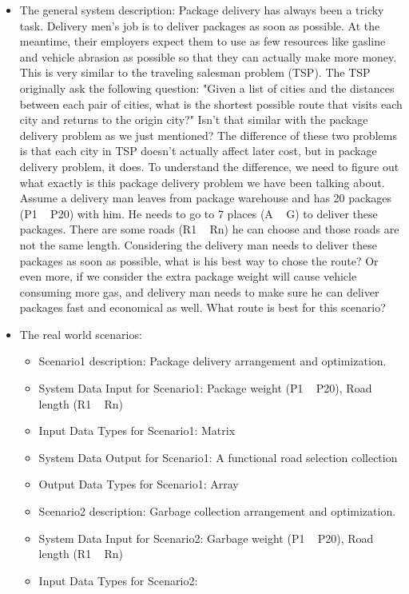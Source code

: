 \begin{itemize} 
\item{The general system description: } 
Package delivery has always been a tricky task. Delivery men's job is to deliver packages as soon as possible. At the meantime, their employers expect them to use as few resources like gasline and vehicle abrasion as possible so that they can actually make more money. This is very similar to the traveling salesman problem (TSP). The TSP originally ask the following question: "Given a list of cities and the distances between each pair of cities, what is the shortest possible route that visits each city and returns to the origin city?" Isn't that similar with the package delivery problem as we just mentioned? The difference of these two problems is that each city in TSP doesn't actually affect later cost, but in package delivery problem, it does.
To understand the difference, we need to figure out what exactly is this package delivery problem we have been talking about. Assume a delivery man leaves from package warehouse and has 20 packages (P1 ~ P20) with him. He needs to go to 7 places (A ~ G) to deliver these packages. There are some roads (R1 ~ Rn) he can choose and those roads are not the same length. Considering the delivery man needs to deliver these packages as soon as possible, what is his best way to chose the route? Or even more, if we consider the extra package weight will cause vehicle consuming more gas, and delivery man needs to make sure he can deliver packages fast and economical as well. What route is best for this scenario?
\item{The real world scenarios: }
\begin{itemize} 
\item{Scenario1 description: }
Package delivery arrangement and optimization.
\item{System Data Input for Scenario1: }
Package weight (P1 ~ P20), Road length (R1 ~ Rn)
\item{Input Data Types for Scenario1: }
Matrix
\item{System Data Output for Scenario1: }
A functional road selection collection
\item{Output Data Types for Scenario1: }
Array
\item{Scenario2 description: }
Garbage collection arrangement and optimization.
\item{System Data Input for Scenario2: }
Garbage weight (P1 ~ P20), Road length (R1 ~ Rn)
\item{Input Data Types for Scenario2: }

\end{itemize}
\end{itemize}
